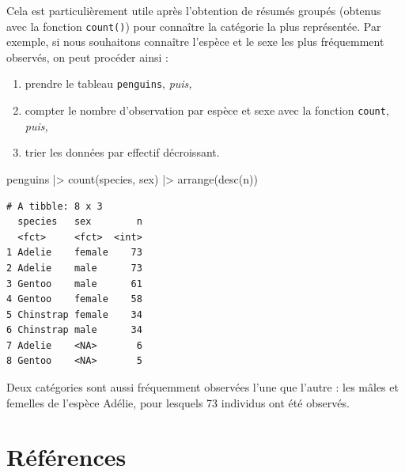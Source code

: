 \documentclass[
  a4paper,
  DIV=11,
  numbers=noendperiod,
  oneside]{scrreprt}
\newenvironment{Shaded}{}{}
\newcommand{\FunctionTok}[1]{\textcolor[rgb]{0.44,0.26,0.76}{#1}}
\newcommand{\NormalTok}[1]{\textcolor[rgb]{0.14,0.16,0.18}{#1}}
\newcommand{\SpecialCharTok}[1]{\textcolor[rgb]{0.00,0.36,0.77}{#1}}
\providecommand{\tightlist}{%
  \setlength{\itemsep}{0pt}\setlength{\parskip}{0pt}}\usepackage{longtable,booktabs,array}
\begin{document}
Cela est particulièrement utile après l'obtention de résumés groupés
(obtenus avec la fonction \texttt{count()}) pour connaître la catégorie
la plus représentée. Par exemple, si nous souhaitons connaître l'espèce
et le sexe les plus fréquemment observés, on peut procéder ainsi :

\begin{enumerate}
\def\labelenumi{\arabic{enumi}.}
\tightlist
\item
  prendre le tableau \texttt{penguins}, \emph{puis,}
\item
  compter le nombre d'observation par espèce et sexe avec la fonction
  \texttt{count}, \emph{puis,}
\item
  trier les données par effectif décroissant.
\end{enumerate}

\begin{Shaded}
\begin{Highlighting}[]
\NormalTok{penguins }\SpecialCharTok{|\textgreater{}}
  \FunctionTok{count}\NormalTok{(species, sex) }\SpecialCharTok{|\textgreater{}}
  \FunctionTok{arrange}\NormalTok{(}\FunctionTok{desc}\NormalTok{(n))}
\end{Highlighting}
\end{Shaded}

\begin{verbatim}
# A tibble: 8 x 3
  species   sex        n
  <fct>     <fct>  <int>
1 Adelie    female    73
2 Adelie    male      73
3 Gentoo    male      61
4 Gentoo    female    58
5 Chinstrap female    34
6 Chinstrap male      34
7 Adelie    <NA>       6
8 Gentoo    <NA>       5
\end{verbatim}

Deux catégories sont aussi fréquemment observées l'une que l'autre : les
mâles et femelles de l'espèce Adélie, pour lesquels 73 individus ont été
observés.


\chapter*{Références}\label{ruxe9fuxe9rences}

\end{document}
